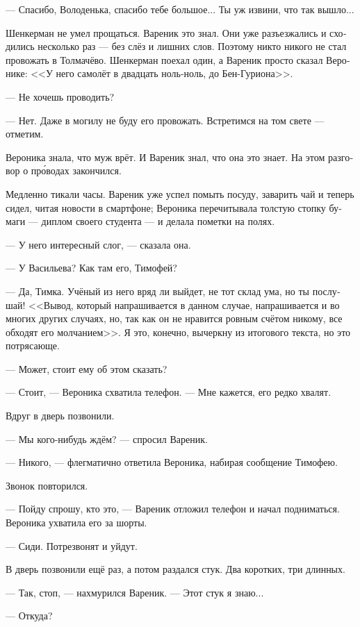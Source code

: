 \documentclass[a5paper,12pt,fleqn]{extbook}\usepackage{cooltooltips}\usepackage{polyglossia}\setdefaultlanguage[babelshorthands=true]{russian}\setotherlanguage{english}\defaultfontfeatures{Ligatures=TeX,Mapping=tex-text} \usepackage{xcolor}\definecolor{lightgray}{HTML}{bbbbbb}\color{lightgray}\newcommand{\ml}[3]{\textenglish{\textcolor{black}{#3}}}
\newcommand{\asterism}{\vspace{1em}{\centering\Large\bfseries$\ast~\ast~\ast$\par}\vspace{1em}}
\begin{document}
--- Спасибо, Володенька, спасибо тебе большое...
Ты уж извини, что так вышло...

\asterism

Шенкерман не умел прощаться.
Вареник это знал.
Они уже разъезжались и сходились несколько раз --- без слёз и лишних слов.
Поэтому никто никого не стал провожать в Толмачёво.
Шенкерман поехал один, а Вареник просто сказал Веронике:
<<У него самолёт в двадцать ноль-ноль, до Бен-Гуриона>>.

--- Не хочешь проводить?

--- Нет.
Даже в могилу не буду его провожать.
Встретимся на том свете --- отметим.

Вероника знала, что муж врёт.
И Вареник знал, что она это знает.
На этом разговор о пр\'оводах закончился.

Медленно тикали часы.
Вареник уже успел помыть посуду, заварить чай и теперь сидел, читая новости в смартфоне;
Вероника перечитывала толстую стопку бумаги --- диплом своего студента --- и делала пометки на полях.

--- У него интересный слог, --- сказала она.

--- У Васильева?
Как там его, Тимофей?

--- Да, Тимка.
Учёный из него вряд ли выйдет, не тот склад ума, но ты послушай!
<<Вывод, который напрашивается в данном случае, напрашивается и во многих других случаях, но, так как он не нравится ровным счётом никому, все обходят его молчанием>>.
Я это, конечно, вычеркну из итогового текста, но это потрясающе.

--- Может, стоит ему об этом сказать?

--- Стоит, --- Вероника схватила телефон.
--- Мне кажется, его редко хвалят.

Вдруг в дверь позвонили.

--- Мы кого-нибудь ждём? --- спросил Вареник.

--- Никого, --- флегматично ответила Вероника, набирая сообщение Тимофею.

Звонок повторился.

--- Пойду спрошу, кто это, --- Вареник отложил телефон и начал подниматься.
Вероника ухватила его за шорты.

--- Сиди.
Потрезвонят и уйдут.

В дверь позвонили ещё раз, а потом раздался стук.
Два коротких, три длинных.

--- Так, стоп, --- нахмурился Вареник.
--- Этот стук я знаю...

--- Откуда?
\end{document}

